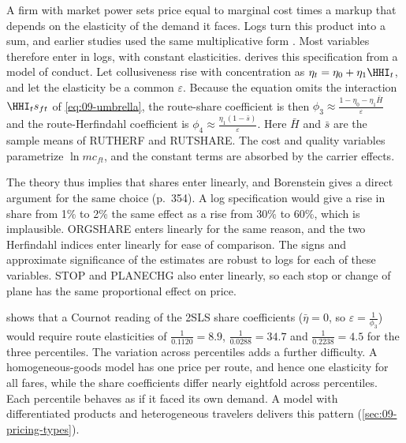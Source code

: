  A firm with market power sets price equal to marginal cost times a markup that
depends on the elasticity of the demand it faces. Logs turn this product into a sum, and earlier studies used
the same multiplicative form \citep{GrahamKaplanSibley1983,BaileyGrahamKaplan1985}. Most variables therefore
enter in logs, with constant elasticities.  derives this specification from a
model of conduct. Let collusiveness rise with concentration as $\eta_t = \eta_0 + \eta_1 \HHI_t$, and let the
elasticity be a common $\varepsilon$. Because the equation omits the interaction $\HHI_t s_{ft}$ of
\cref{eq:09-umbrella}, the route-share coefficient is then $\phi_3 \approx \frac{1 - \eta_0 - \eta_1 \bar H}{\varepsilon}$
and the route-Herfindahl coefficient is $\phi_4 \approx \frac{\eta_1 (1 - \bar s)}{\varepsilon}$. Here $\bar H$
and $\bar s$ are the sample means of RUTHERF and RUTSHARE. The cost and quality variables parametrize
$\ln mc_{ft}$, and the constant terms are absorbed by the carrier effects.

The theory thus implies that shares enter linearly, and Borenstein gives a direct argument for the same choice
(p.~354). A log specification would give a rise in share from 1\% to 2\% the same effect as a rise from 30\% to
60\%, which is implausible. ORGSHARE enters linearly for the same reason, and
the two Herfindahl indices enter linearly for ease of comparison. The signs and approximate significance of
the estimates are robust to logs for each of these variables. STOP and PLANECHG also enter linearly, so each
stop or change of plane has the same proportional effect on price.

 shows that a Cournot reading of the 2SLS share coefficients ($\bar\eta = 0$, so
$\varepsilon = \frac{1}{\phi_3}$) would require route elasticities of $\frac{1}{0.1120} = 8.9$,
$\frac{1}{0.0288} = 34.7$ and $\frac{1}{0.2238} = 4.5$ for the three percentiles. The variation across
percentiles adds a further difficulty. A homogeneous-goods model has one price per route, and hence one
elasticity for all fares, while the share coefficients differ nearly eightfold across percentiles. Each
percentile behaves as if it faced its own demand. A model with differentiated products and heterogeneous
travelers delivers this pattern (\cref{sec:09-pricing-types}).

